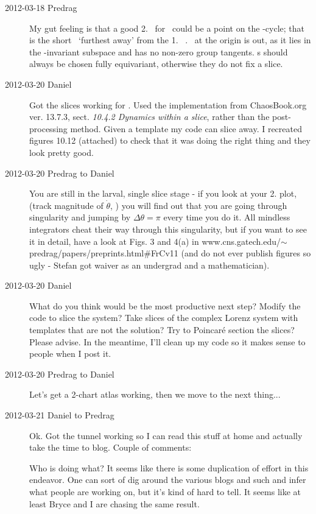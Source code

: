 \begin{description}
\item[2012-03-18 Predrag] My gut feeling is that a good 2. \template\ for
\cLf\ could be a point on the -cycle; that is the short \rpo\
`furthest away' from the 1. \template\ . \Eqv\ at the origin is
out, as it lies in the \Group-invariant subspace and has no non-zero
group tangents. \Template s should always be chosen fully equivariant,
otherwise they do not fix a slice.

\item[2012-03-20 Daniel]
Got the slices working for \cLf. Used the implementation from
ChaosBook.org ver. 13.7.3, sect. \emph{10.4.2 Dynamics within a slice},
rather than the post-processing method. Given a template my code can
slice away. I recreated figures 10.12 (attached) to check that it was
doing the right thing and they look pretty good.


\item[2012-03-20 Predrag  to Daniel]
You are still in the larval, single slice stage - if you look at your 2.
plot, (track magnitude of $\dot{\theta}$, \etc) you will find out that
you are going through singularity and jumping by $\Delta \theta = \pi$
every time you do it. All mindless integrators cheat their way through
this singularity, but if you want to see it in detail, have a look at
Figs. 3 and 4(a) in
{www.cns.gatech.edu/$\sim$predrag/papers/preprints.html\#FrCv11} (and do
not ever publish figures so ugly - Stefan\rf{FrCv11} got waiver as an
undergrad and a mathematician).

\item[2012-03-20 Daniel]
What do you think would be the most productive next step? Modify the code
to slice the {\twoMode} system? Take slices of the complex Lorenz system with
templates that are not the {\eqv} solution? Try to Poincar\'e
section the slices? Please advise. In the meantime, I'll clean up my code
so it makes sense to people when I post it.

\item[2012-03-20 Predrag  to Daniel] Let's get a 2-chart atlas working, then
we move to the next thing...

\item[2012-03-21 Daniel  to Predrag] Ok. Got the tunnel working so I can
read this stuff at home and actually take the time to blog. Couple of
comments:

Who is doing what? It seems like there is some duplication of effort in
this endeavor. One can sort of dig around the various blogs and such and
infer what people are working on, but it's kind of hard to tell. It seems
like at least Bryce and I are chasing the same result.


\end{description}
